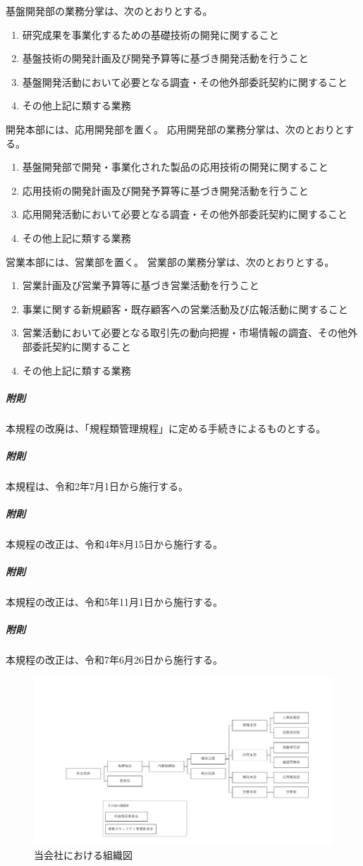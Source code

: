 \documentclass[10pt,a4paper,uplatex,dvipdfmx]{jsarticle}
\begin{document}
\term 基盤開発部の業務分掌は、次のとおりとする。
\begin{enumerate}
	\item 研究成果を事業化するための基礎技術の開発に関すること
	\item 基盤技術の開発計画及び開発予算等に基づき開発活動を行うこと
	\item 基盤開発活動において必要となる調査・その他外部委託契約に関すること
	\item その他上記に類する業務
\end{enumerate}

開発本部には、応用開発部を置く。
\term 応用開発部の業務分掌は、次のとおりとする。
\begin{enumerate}
	\item 基盤開発部で開発・事業化された製品の応用技術の開発に関すること
	\item 応用技術の開発計画及び開発予算等に基づき開発活動を行うこと
	\item 応用開発活動において必要となる調査・その他外部委託契約に関すること
	\item その他上記に類する業務
\end{enumerate}

営業本部には、営業部を置く。
\term 営業部の業務分掌は、次のとおりとする。
\begin{enumerate}
	\item 営業計画及び営業予算等に基づき営業活動を行うこと
	\item 事業に関する新規顧客・既存顧客への営業活動及び広報活動に関すること
	\item 営業活動において必要となる取引先の動向把握・市場情報の調査、その他外部委託契約に関すること
	\item その他上記に類する業務
\end{enumerate}

\vspace{1cm}
\subparagraph{附則}本規程の改廃は、「規程類管理規程」に定める手続きによるものとする。
\subparagraph{附則}本規程は、令和2年7月1日から施行する。
\subparagraph{附則}本規程の改正は、令和4年8月15日から施行する。
\subparagraph{附則}本規程の改正は、令和5年11月1日から施行する。
\subparagraph{附則}本規程の改正は、令和7年6月26日から施行する。

\clearpage

\begin{figure}[h]
\centering
	\includegraphics[trim={1cm 0cm 1cm 0cm},clip,width=1.0\linewidth]{figs/soshiki.pdf}
\caption{当会社における組織図}
\label{fig:soshiki}
\end{figure}
\end{document}
